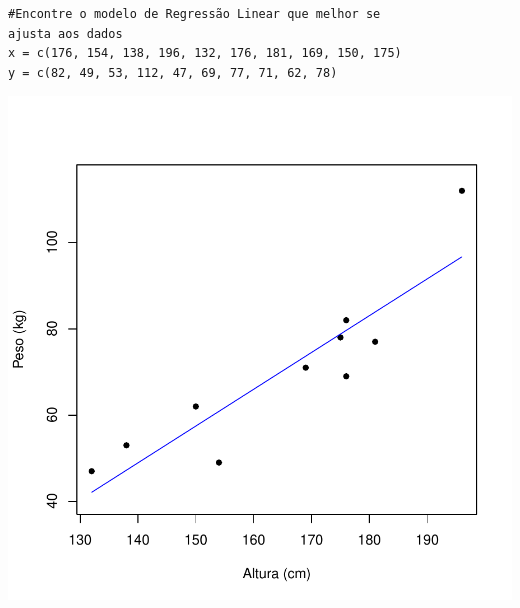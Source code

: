 \documentclass[14pt,aspectratio=1610]{beamer}
\begin{document}
\begin{frame}[fragile]{}
\frametitle{ }
\begin{block}{}
\begin{center}
\begin{verbatim}
#Encontre o modelo de Regressão Linear que melhor se
ajusta aos dados
x = c(176, 154, 138, 196, 132, 176, 181, 169, 150, 175)
y = c(82, 49, 53, 112, 47, 69, 77, 71, 62, 78)    
\end{verbatim}
\end{center}
\end{block}
\vspace{-1.3cm}
\begin{center}
\includegraphics{Aula4Regressao/Figuras/Aula4-008}
\end{center}
\end{frame}
\end{document}
